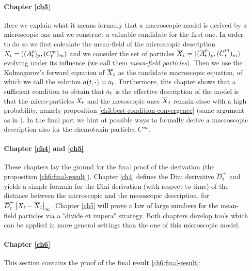 \paragraph{Chapter \ref{ch3}} Here we explain what it means formally that a macroscopic model is derived by a microscopic one and we construct a valuable candidate for the first one.
In order to do so we first calculate the mean-field of the microscopic description $X_t = ( (A_t^p)_p, (C_t^m)_m)$ and we consider the set of \iid particles $\overline{X}_t = ( (\overline{A}_t^p)_p, (\overline{C}_t^m)_m)$ evolving under its influence (we call them \emph{mean-field particles}).
Then we use the Kolmogorov's forward equation of $\overline{X}_t$ as the candidate macroscopic equation, of which we call the solution $a(t,\cdot) = a_t$.
Furthermore, this chapter shows that a sufficient condition to obtain that $a_t$ is the effective description of the model is that the micro-particles $X_t$ and the mesoscopic ones $\overline{X}_t$ remain close with a high probability, namely proposition \ref{ch3:best-condition-convergence} (same argument as in \cite{ana}).
In the final part we hint at possible ways to formally derive a macroscopic description also for the chemotaxin particles $C^m$.

\paragraph{Chapter \ref{ch4} and \ref{ch5}} These chapters lay the ground for the final proof of the derivation (\ie the proposition \ref{ch6:final-result}).
Chapter \ref{ch4} defines the Dini derivative $\overline{D}_t^+$ and yields a simple formula for the Dini derivation (with respect to time) of the distance between the microscopic and the mesoscopic description, \ie for $\overline{D}_t^+ \left| X_t -\overline{X}_t \right|_\infty$.
Chapter \ref{ch5} will prove a law of large numbers for the mean-field particles via a "divide et impera" strategy.
Both chapters develop tools which can be applied in more general settings than the one of this microscopic model.

\paragraph{Chapter \ref{ch6}} This section contains the proof of the final result \ref{ch6:final-result}:

